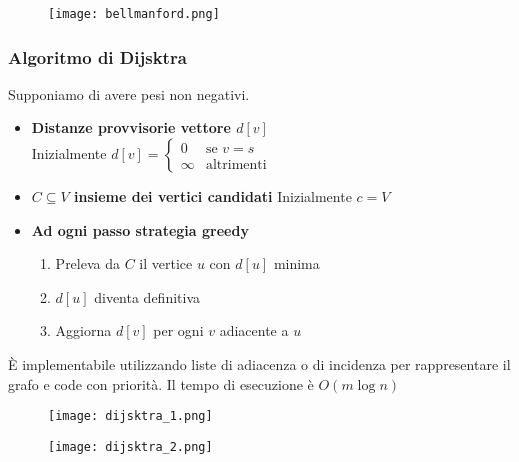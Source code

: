 \begin{figure}[h]
    \texttt{[image: bellmanford.png]}
\end{figure}

\clearpage

\subsubsection{Algoritmo di Dijsktra}
Supponiamo di avere pesi non negativi.
\begin{itemize}
    \item \textbf{Distanze provvisorie vettore $d[v]$}\\
    Inizialmente $d[v] = \begin{cases}
        0 & \text{se $v = s$}\\
        \infty & \text{altrimenti}
    \end{cases}$
    \item \textbf{$C \subseteq V$ insieme dei vertici candidati}
    Inizialmente $c = V$
    \item \textbf{Ad ogni passo strategia greedy}
    \begin{enumerate}
        \item Preleva da $C$ il vertice $u$ con $d[u]$ minima
        \item $d[u]$ diventa definitiva
        \item Aggiorna $d[v]$ per ogni $v$ adiacente a $u$
    \end{enumerate}
\end{itemize}
È implementabile utilizzando liste di adiacenza o di incidenza per rappresentare
il grafo e code con priorità.
Il tempo di esecuzione è $O(m \log n)$

\begin{figure}[h]
    \texttt{[image: dijsktra\_1.png]}
\end{figure}

\begin{figure}[h]
    \texttt{[image: dijsktra\_2.png]}
\end{figure}


\clearpage